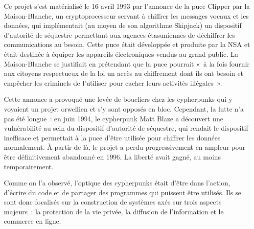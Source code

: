 Ce projet s'est matérialisé le 16 avril 1993 par l'annonce de la puce Clipper par la Maison-Blanche, un cryptoprocesseur servant à chiffrer les messages vocaux et les données, qui implémentait (au moyen de son algorithme Skipjack) un dispositif d'autorité de séquestre permettant aux agences étasuniennes de déchiffrer les communications au besoin. Cette puce était développée et produite par la NSA et était destinée à équiper les appareils électroniques vendus au grand public. La Maison-Blanche se justifiait en prétendant que la puce pourrait «~à la fois fournir aux citoyens respectueux de la loi un accès au chiffrement dont ils ont besoin et empêcher les criminels de l'utiliser pour cacher leurs activités illégales~».

Cette annonce a provoqué une levée de boucliers chez les cypherpunks qui y voyaient un projet orwellien et s'y sont opposés en bloc. Cependant, la lutte n'a pas été longue~: en juin 1994, le cypherpunk Matt Blaze a découvert une vulnérabilité au sein du dispositif d'autorité de séquestre, qui rendait le dispositif inefficace et permettait à la puce d'être utilisée pour chiffrer les données normalement. À partir de là, le projet a perdu progressivement en ampleur pour être définitivement abandonné en 1996. La liberté avait gagné, au moins temporairement.


Comme on l'a observé, l'optique des cypherpunks était d'être dans l'action, d'écrire du code et de partager des programmes qui puissent être utilisés. Ils se sont donc focalisés sur la construction de systèmes axés sur trois aspects majeurs~: la protection de la vie privée, la diffusion de l'information et le commerce en ligne. %

